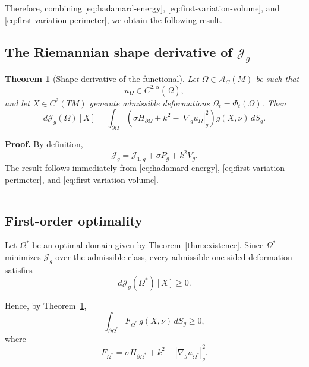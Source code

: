 \documentclass{article}
\renewcommand{\boxed}[1]{#1}
\newtheorem{theorem}{Theorem}[section]
\newenvironment{proof}[1][Proof]{\textbf{#1.} }{\ \rule{0.5em}{0.5em}}
\begin{document}
Therefore, combining
\eqref{eq:hadamard-energy},
\eqref{eq:first-variation-volume}, and
\eqref{eq:first-variation-perimeter}, we obtain the following result.


\subsection{The Riemannian shape derivative of $\mathcal J_g$}
\label{subsec:shape-derivative-Jg}

\begin{theorem}[Shape derivative of the functional]
\label{thm:shape-derivative-Jg}
Let $\Omega\in\mathcal A_C(M)$ be such that
\[
u_\Omega\in C^{2,\alpha}(\overline{\Omega}),
\]
and let $X\in C^2(TM)$ generate admissible deformations
$\Omega_t=\Phi_t(\Omega)$. Then
\begin{equation}
\boxed{
d\mathcal J_g(\Omega)[X]
=
\int_{\partial\Omega}
\left(
\sigma H_{\partial\Omega}
+k^2
-
|\nabla_g u_\Omega|_g^2
\right)
g(X,\nu)\,dS_g.
}
\label{eq:shape-derivative-Jg}
\end{equation}
\end{theorem}

\begin{proof}
By definition,
\[
\mathcal J_g
=
\mathcal J_{1,g}
+
\sigma P_g
+
k^2V_g.
\]
The result follows immediately from
\eqref{eq:hadamard-energy},
\eqref{eq:first-variation-perimeter}, and
\eqref{eq:first-variation-volume}.
\end{proof}


\subsection{First-order optimality}
\label{subsec:first-order-optimality}

Let $\Omega^\ast$ be an optimal domain given by
Theorem~\ref{thm:existence}. Since $\Omega^\ast$ minimizes
$\mathcal J_g$ over the admissible class, every admissible one-sided
deformation satisfies
\begin{equation}
d\mathcal J_g(\Omega^\ast)[X]\geq0.
\label{eq:one-sided-optimality}
\end{equation}

Hence, by Theorem~\ref{thm:shape-derivative-Jg},
\begin{equation}
\boxed{
\int_{\partial\Omega^\ast}
F_{\Omega^\ast}
\,g(X,\nu)\,dS_g
\geq0,
}
\label{eq:variational-inequality}
\end{equation}
where
\begin{equation}
F_{\Omega^\ast}
=
\sigma H_{\partial\Omega^\ast}
+k^2
-
|\nabla_g u_{\Omega^\ast}|_g^2.
\label{eq:F-definition}
\end{equation}
\end{document}
